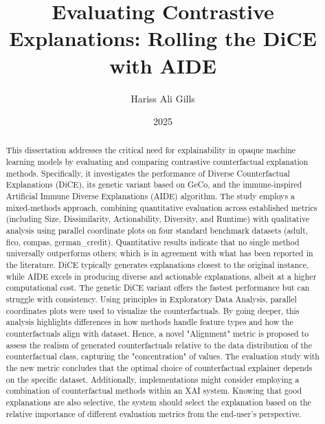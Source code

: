\documentclass[mscip, 12pt]{abdnthesis}
\title{Evaluating Contrastive Explanations: Rolling the DiCE with AIDE}
\author{Hariss Ali Gills}
\date{2025}
\begin{document}

\maketitle
\makedeclaration


\begin{abstract}
This dissertation addresses the critical need for explainability in opaque machine learning models by evaluating and comparing contrastive counterfactual explanation methods. Specifically, it investigates the performance of Diverse Counterfactual Explanations (DiCE), its genetic variant based on GeCo, and the immune-inspired Artificial Immune Diverse Explanations (AIDE) algorithm. The study employs a mixed-methods approach, combining quantitative evaluation across established metrics (including Size, Dissimilarity, Actionability, Diversity, and Runtime) with qualitative analysis using parallel coordinate plots on four standard benchmark datasets (adult, fico, compas, german\_credit). Quantitative results indicate that no single method universally outperforms others; which is in agreement with what has been reported in the literature. DiCE typically generates explanations closest to the original instance, while AIDE excels in producing diverse and actionable explanations, albeit at a higher computational cost. The genetic DiCE variant offers the fastest performance but can struggle with consistency. Using principles in Exploratory Data Analysis, parallel coordinates plots were used to visualize the counterfactuals. By going deeper, this analysis highlights differences in how methods handle feature types and how the counterfactuals align with dataset. Hence, a novel "Alignment" metric is proposed to assess the realism of generated counterfactuals relative to the data distribution of the counterfactual class, capturing the "concentration" of values. The evaluation study with the new metric concludes that the optimal choice of counterfactual explainer depends on the specific dataset. Additionally, implementations might consider employing a combination of counterfactual methods within an XAI system. Knowing that good explanations are also selective, the system should select the explanation based on the relative importance of different evaluation metrics from the end-user's perspective.

\end{abstract}
\end{document}
